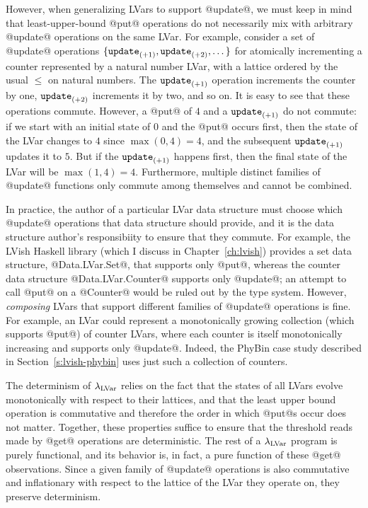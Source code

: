 However, when generalizing LVars to support @update@, we must keep in
mind that least-upper-bound @put@ operations do not necessarily mix
with arbitrary @update@ operations on the same LVar.  For example,
consider a set of @update@ operations $\{\mbox{\texttt{update}}_{(+1)},
\mbox{\texttt{update}}_{(+2)}, \dots \}$ for atomically incrementing a counter
represented by a natural number LVar, with a lattice ordered by the
usual $\leq$ on natural numbers.  The $\mbox{\texttt{update}}_{(+1)}$ operation
increments the counter by one, $\mbox{\texttt{update}}_{(+2)}$ increments it by two,
and so on.  It is easy to see that these operations commute.  However,
a @put@ of $4$ and a $\mbox{\texttt{update}}_{(+1)}$ do not commute: if we start with
an initial state of $0$ and the @put@ occurs first, then the state of
the LVar changes to $4$ since $\max(0, 4) = 4$, and the subsequent
$\mbox{\texttt{update}}_{(+1)}$ updates it to $5$.  But if the $\mbox{\texttt{update}}_{(+1)}$
happens first, then the final state of the LVar will be $\max(1, 4) =
4$.  Furthermore, multiple distinct families of @update@ functions
only commute among themselves and cannot be combined.

In practice, the author of a particular LVar data structure must
choose which @update@ operations that data structure should provide,
and it is the data structure author's responsibiity to ensure that
they commute.  For example, the LVish Haskell library (which I discuss
in Chapter~\ref{ch:lvish}) provides a set data structure,
@Data.LVar.Set@, that supports only @put@, whereas the counter data
structure @Data.LVar.Counter@ supports only @update@; an attempt to
call @put@ on a @Counter@ would be ruled out by the type system.
However, \emph{composing} LVars that support different families of
@update@ operations is fine.  For example, an LVar could represent a
monotonically growing collection (which supports @put@) of counter
LVars, where each counter is itself monotonically increasing and
supports only @update@.  Indeed, the PhyBin case study described in
Section~\ref{s:lvish-phybin} uses just such a collection of counters.

The determinism of $\lambda_{\textrm{LVar}}$ relies on the fact that the states of
all LVars evolve monotonically with respect to their lattices, and
that the least upper bound operation is commutative and therefore the
order in which @put@s occur does not matter.  Together, these
properties suffice to ensure that the threshold reads made by @get@
operations are deterministic. The rest of a $\lambda_{\textrm{LVar}}$ program is
purely functional, and its behavior is, in fact, a pure function of
these @get@ observations.  Since a given family of @update@ operations
is also commutative and inflationary with respect to the lattice of
the LVar they operate on, they preserve determinism.

